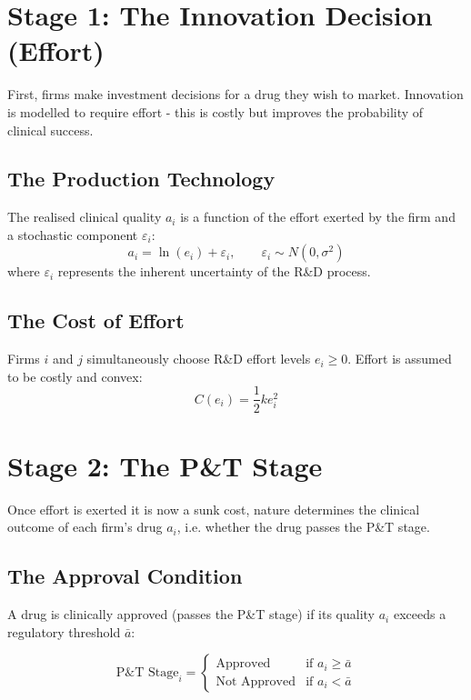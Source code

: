 \documentclass[12pt]{article}
\begin{document}
\newpage

\section{Stage 1: The Innovation Decision (Effort)}

First, firms make investment decisions for a drug they wish to market. Innovation is modelled to require effort - this is costly but improves the probability of clinical success.

\subsection{The Production Technology}
The realised clinical quality $a_i$ is a function of the effort exerted by the firm and a stochastic component $\varepsilon_i$:
\begin{equation}
    a_i = \ln(e_i) + \varepsilon_i, \qquad \varepsilon_i \sim N(0, \sigma^2)
\end{equation}
where $\varepsilon_i$ represents the inherent uncertainty of the R\&D process.

\subsection{The Cost of Effort}
Firms $i$ and $j$ simultaneously choose R\&D effort levels $e_i \geq 0$. Effort is assumed to be costly and convex:
\begin{equation}
    C(e_i) = \frac{1}{2} k e_i^2
\end{equation}

\newpage

\section{Stage 2: The P\&T Stage}
Once effort is exerted it is now a sunk cost, nature determines the clinical outcome of each firm's drug $a_i$, i.e. whether the drug passes the P\&T stage.

\subsection{The Approval Condition}
A drug is clinically approved (passes the P\&T stage) if its quality $a_i$ exceeds a regulatory threshold $\bar{a}$:

\begin{equation}
    \text{P\&T Stage}_i = 
    \begin{cases} 
        \text{Approved} & \text{if } a_i \geq \bar{a} \\
        \text{Not Approved} & \text{if } a_i < \bar{a}
    \end{cases}
\end{equation}
\end{document}
